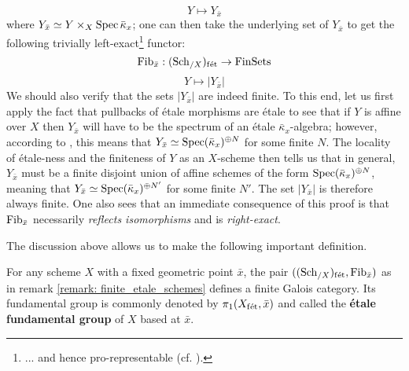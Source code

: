 \begin{remark}
                    $$Y \mapsto Y_{\bar{x}}$$
                where $Y_{\bar{x}} \cong Y \x_X \Spec \bar{\kappa}_x$; one can then take the underlying set of $Y_{\bar{x}}$ to get the following trivially left-exact\footnote{... and hence pro-representable (cf. \cite[Proposition 3.1]{grothendieck_fga_2}).} functor:
                    $$\mathrm{Fib}_{\bar{x}}: (\mathrm{Sch}_{/X})_{\mathrm{f\acute{e}t}} \to \mathrm{Fin}\mathrm{Sets}$$
                    $$Y \mapsto |Y_{\bar{x}}|$$
                We should also verify that the sets $|Y_{\bar{x}}|$ are indeed finite. To this end, let us first apply the fact that pullbacks of \'etale morphisms are \'etale to see that if $Y$ is affine over $X$ then $Y_{\bar{x}}$ will have to be the spectrum of an \'etale $\bar{\kappa}_x$-algebra; however, according to \cite[\href{https://stacks.math.columbia.edu/tag/00U3}{Tag 00U3}]{stacks}, this means that $Y_{\bar{x}} \simeq \operatorname{Spec} (\bar{\kappa}_x)^{\oplus N}$ for some finite $N$. The locality of \'etale-ness and the finiteness of $Y$ as an $X$-scheme then tells us that in general, $Y_{\bar{x}}$ must be a finite disjoint union of affine schemes of the form $\operatorname{Spec} (\bar{\kappa}_x)^{\oplus N}$, meaning that $Y_{\bar{x}} \simeq \operatorname{Spec} (\bar{\kappa}_x)^{\oplus N'}$ for some finite $N'$. The set $|Y_{\bar{x}}|$ is therefore always finite. One also sees that an immediate consequence of this proof is that $\mathrm{Fib}_{\bar{x}}$ necessarily \textit{reflects isomorphisms} and is \textit{right-exact}. 
            \end{remark}
            
            The discussion above allows us to make the following important definition.
            \begin{definition} \label{def: etale_fundamental_groups}
                For any scheme $X$ with a fixed geometric point $\bar{x}$, the pair $((\mathrm{Sch}_{/X})_{\mathrm{f\acute{e}t}}, \mathrm{Fib}_{\bar{x}})$ as in remark \ref{remark: finite_etale_schemes} defines a finite Galois category. Its fundamental group is commonly denoted by $\pi_1(X_{\mathrm{f\acute{e}t}}, \bar{x})$ and called the \textbf{\'etale fundamental group} of $X$ based at $\bar{x}$.
            \end{definition}
            
